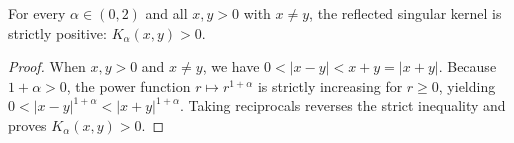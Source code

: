\begin{theorem}\label{thm:reflected_kernel_pos}
\leanok
For every $\alpha \in (0, 2)$ and all $x, y > 0$ with $x \neq y$, the reflected singular kernel is strictly positive: $K_\alpha(x, y) > 0$.
\end{theorem}

\begin{proof}
\leanok
When $x, y > 0$ and $x \neq y$, we have $0 < \lvert x - y \rvert < x + y = \lvert x + y \rvert$. Because $1 + \alpha > 0$, the power function $r \mapsto r^{1 + \alpha}$ is strictly increasing for $r \ge 0$, yielding $0 < \lvert x - y \rvert^{1 + \alpha} < \lvert x + y \rvert^{1 + \alpha}$. Taking reciprocals reverses the strict inequality and proves $K_\alpha(x, y) > 0$.
\end{proof}
